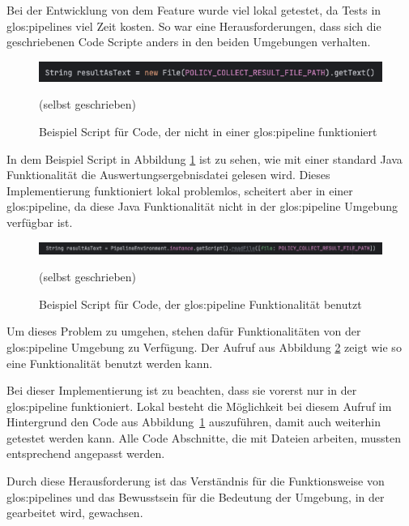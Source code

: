 \documentclass[../main.tex]{subfiles}
\begin{document}
Bei der Entwicklung von dem Feature wurde viel lokal getestet, da Tests in \glspl{glos:pipeline} viel Zeit kosten.
So war eine Herausforderungen, dass sich die geschriebenen Code Scripte anders in den beiden Umgebungen verhalten.

\begin{figure}[ht]
    \centering
    \includegraphics[scale=0.45]{bilder/codebad.png}
    \caption{Beispiel Script für Code, der nicht in einer \gls{glos:pipeline} funktioniert}
    \footnotesize (selbst geschrieben)
    \label{fig:codebad}
\end{figure}


In dem Beispiel Script in Abbildung \ref{fig:codebad} ist zu sehen, wie mit einer standard Java Funktionalität die Auswertungsergebnisdatei gelesen wird.
Dieses Implementierung funktioniert lokal problemlos, scheitert aber in einer \gls{glos:pipeline}, da diese Java Funktionalität nicht in der \gls{glos:pipeline} Umgebung verfügbar ist.

\begin{figure}[ht]
    \centering
    \includegraphics[scale=0.45]{bilder/codegood.png}
    \caption{Beispiel Script für Code, der \gls{glos:pipeline} Funktionalität benutzt}
    \footnotesize (selbst geschrieben)
    \label{fig:codegood}
\end{figure}
        
Um dieses Problem zu umgehen, stehen dafür Funktionalitäten von der \gls{glos:pipeline} Umgebung zu Verfügung.
Der Aufruf aus Abbildung \ref{fig:codegood} zeigt wie so eine Funktionalität benutzt werden kann.

Bei dieser Implementierung ist zu beachten, dass sie vorerst nur in der \gls{glos:pipeline} funktioniert.
Lokal besteht die Möglichkeit bei diesem Aufruf im Hintergrund den Code aus Abbildung \ref{fig:codebad} auszuführen, damit auch weiterhin getestet werden kann.
Alle Code Abschnitte, die mit Dateien arbeiten, mussten entsprechend angepasst werden.

Durch diese Herausforderung ist das Verständnis für die Funktionsweise von \glspl{glos:pipeline} und das Bewusstsein für die Bedeutung der Umgebung, in der gearbeitet wird, gewachsen.
\end{document}
